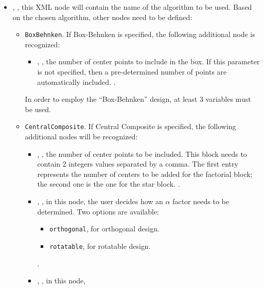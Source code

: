      \begin{itemize}
      \item {}, , this XML node
        will contain the name of the algorithm to be used.
        Based on the chosen algorithm, other nodes need to be defined:
        \begin{itemize}
          \item {}\texttt{BoxBehnken}. If Box-Behnken
            is specified, the following additional node is recognized:
         \begin{itemize}
          \item {}, , the
            number of center points to include in the box.
            If this parameter is not specified, then a pre-determined number of
            points are automatically included.
            .
         \end{itemize}
         \nb In order to employ the ``Box-Behnken'' design, at least 3 variables
         must be used.
         \item {}\texttt{CentralComposite}. If
           Central Composite is specified, the following additional nodes will
           be recognized:
         \begin{itemize}
          \item {}, , the number of center points to be included.
            This block needs to contain 2 integers values separated by a comma.
            The first entry represents the number of centers to be added for the
            factorial block; the second one is the one for the star block.
            .
          \item {}, , in this node,
            the user decides how an $\alpha$ factor needs to be determined.
            Two options are available:
            \begin{itemize}
              \item \texttt{orthogonal}, for orthogonal design.
              \item \texttt{rotatable}, for rotatable design.
            \end{itemize}
            .
          \item {}, , in this node,

\end{itemize}
\end{itemize}
\end{itemize}
